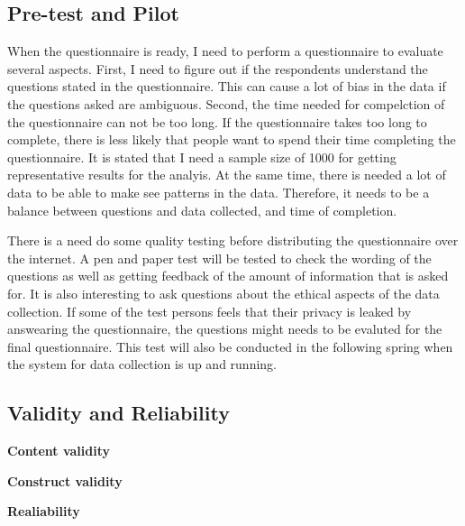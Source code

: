   \subsection{Pre-test and Pilot}
    When the questionnaire is ready, I need to perform a questionnaire to evaluate several aspects. First, I need to figure out if the respondents understand the questions stated in the questionnaire. This can cause a lot of bias in the data if the questions asked are ambiguous. Second, the time needed for compelction of the questionnaire can not be too long. If the questionnaire takes too long to complete, there is less likely that people want to spend their time completing the questionnaire. It is stated that I need a sample size of 1000 for getting representative results for the analyis. At the same time, there is needed a lot of data to be able to make see patterns in the data. Therefore, it needs to be a balance between questions and data collected, and time of completion. 


    There is a need do some quality testing before distributing the questionnaire over the internet. A pen and paper test will be tested to check the wording of the questions as well as getting feedback of the amount of information that is asked for. It is also interesting to ask questions about the ethical aspects of the data collection. If some of the test persons feels that their privacy is leaked by answearing the questionnaire, the questions might needs to be evaluted for the final questionnaire. 
    This test will also be conducted in the following spring when the system for data collection is up and running. 


  \subsection{Validity and Reliability}

    {\bf Content validity}

    {\bf Construct validity}

    {\bf Realiability}





